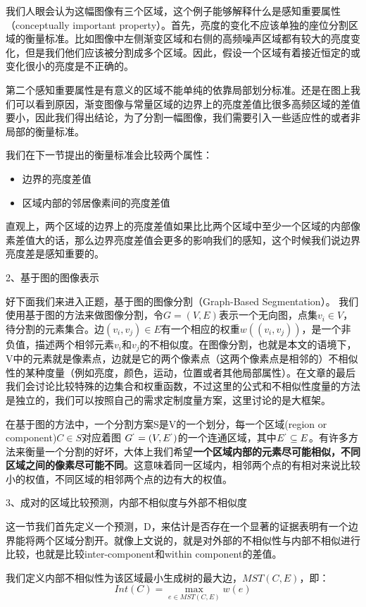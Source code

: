 我们人眼会认为这幅图像有三个区域，这个例子能够解释什么是感知重要属性（conceptually important property）。首先，亮度的变化不应该单独的座位分割区域的衡量标准。比如图像中左侧渐变区域和右侧的高频噪声区域都有较大的亮度变化，但是我们他们应该被分割成多个区域。因此，假设一个区域有着接近恒定的或变化很小的亮度是不正确的。

第二个感知重要属性是有意义的区域不能单纯的依靠局部划分标准。还是在图上我们可以看到原因，渐变图像与常量区域的边界上的亮度差值比很多高频区域的差值要小，因此我们得出结论，为了分割一幅图像，我们需要引入一些适应性的或者非局部的衡量标准。

我们在下一节提出的衡量标准会比较两个属性：
\begin{itemize}
\item 边界的亮度差值
\item 区域内部的邻居像素间的亮度差值
\end{itemize}
直观上，两个区域的边界上的亮度差值如果比比两个区域中至少一个区域的内部像素差值大的话，那么边界亮度差值会更多的影响我们的感知，这个时候我们说边界亮度差是感知重要的。

2、基于图的图像表示

好下面我们来进入正题，基于图的图像分割（Graph-Based Segmentation）。
我们使用基于图的方法来做图像分割，令\(G=(V,E)\)表示一个无向图，点集\(v_i \in V\)，待分割的元素集合。边\((v_i,v_j) \in E\)有一个相应的权重\(w((v_i,v_j))\)，是一个非负值，描述两个相邻元素\(v_i\)和\(v_j\)的不相似度。在图像分割，也就是本文的语境下，V中的元素就是像素点，边就是它的两个像素点（这两个像素点是相邻的）不相似性的某种度量（例如亮度，颜色，运动，位置或者其他局部属性）。在文章的最后我们会讨论比较特殊的边集合和权重函数，不过这里的公式和不相似性度量的方法是独立的，我们可以按照自己的需求定制度量方案，这里讨论的是大框架。

在基于图的方法中，一个分割方案S是V的一个划分，每一个区域(region or component)\(C \in S\)对应着图
\(G^` = (V,E^`)\)的一个连通区域，其中\(E^` \subseteq E\)。有许多方法来衡量一个分割的好坏，大体上我们希望\textbf{一个区域内部的元素尽可能相似，不同区域之间的像素尽可能不同}。这意味着同一区域内，相邻两个点的有相对来说比较小的权值，不同区域的相邻两个点的边有大的权值。

3、成对的区域比较预测，内部不相似度与外部不相似度

这一节我们首先定义一个预测，D，来估计是否存在一个显著的证据表明有一个边界能将两个区域分割开。就像上文说的，就是对外部的不相似性与内部不相似进行比较，也就是比较inter-component和within component的差值。

我们定义内部不相似性为该区域最小生成树的最大边，\(MST(C,E)\)，即：
\begin{equation}
Int(C) = \mathop {\max }\limits_{e \in MST(C,E)}w(e)
\end{equation}


